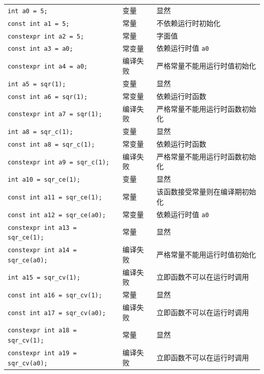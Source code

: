 \begin{tip}
\begin{small}
\begin{longtable}[c]{lll}
      \texttt{int a0 = 5;}  & 变量 & 显然 \\
      \rowcolor{blue!15} \texttt{const int a1 = 5;}  & 常量 & 不依赖运行时初始化 \\
      \texttt{constexpr int a2 = 5;}  & 常量 & 字面值 \\
      \texttt{const int a3 = a0;}  & 常变量 & 依赖运行时值 \texttt{a0}  \\
      \rowcolor{red!15} \texttt{constexpr int a4 = a0;}  & 编译失败 & 严格常量不能用运行时值初始化 \\
      \texttt{int a5 = sqr(1);}  & 变量 & 显然 \\
      \texttt{const int a6 = sqr(1);}  & 常变量 & 依赖运行时函数 \\
      \rowcolor{red!15} \texttt{constexpr int a7 = sqr(1);}  & 编译失败 & 严格常量不能用运行时函数初始化 \\
      \texttt{int a8 = sqr\_c(1);}  & 变量 & 显然 \\
      \texttt{const int a8 = sqr\_c(1);}  & 常变量 & 依赖运行时函数 \\
      \rowcolor{red!15} \texttt{constexpr int a9 = sqr\_c(1);}  & 编译失败 & 严格常量不能用运行时函数初始化 \\
      \texttt{int a10 = sqr\_ce(1);}  & 变量 & 显然 \\
      \rowcolor{blue!15} \texttt{const int a11 = sqr\_ce(1);}  & 常量 & 该函数接受常量则在编译期初始化 \\
      \texttt{const int a12 = sqr\_ce(a0);}  & 常变量 & 依赖运行时值 \texttt{a0}  \\
      \texttt{constexpr int a13 = sqr\_ce(1);}  & 常量 & 显然 \\
      \rowcolor{red!15} \texttt{constexpr int a14 = sqr\_ce(a0);}  & 编译失败 & 严格常量不能用运行时值初始化 \\
      \rowcolor{red!15} \texttt{int a15 = sqr\_cv(1);}  & 编译失败 & 立即函数不可以在运行时调用 \\
      \rowcolor{blue!15} \texttt{const int a16 = sqr\_cv(1);}  & 常量 & 显然 \\
      \rowcolor{red!15} \texttt{const int a17 = sqr\_cv(a0);}  & 编译失败 & 立即函数不可以在运行时调用 \\
      \texttt{constexpr int a18 = sqr\_cv(1);}  & 常量 & 显然 \\
      \rowcolor{red!15} \texttt{constexpr int a19 = sqr\_cv(a0);}  & 编译失败 & 立即函数不可以在运行时调用 \\
    \end{longtable}
  \end{small}
\end{tip}

